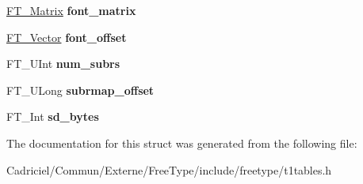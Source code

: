 \begin{DoxyCompactItemize}
\item 
\hypertarget{struct_c_i_d___face_dict_rec___aa418f6ce40b7574b6234e0ab48377e4b}{\hyperlink{struct_f_t___matrix__}{F\-T\-\_\-\-Matrix} {\bfseries font\-\_\-matrix}}\label{struct_c_i_d___face_dict_rec___aa418f6ce40b7574b6234e0ab48377e4b}

\item 
\hypertarget{struct_c_i_d___face_dict_rec___aa62daa8d45ed4a817f1207cbd452d61e}{\hyperlink{struct_f_t___vector__}{F\-T\-\_\-\-Vector} {\bfseries font\-\_\-offset}}\label{struct_c_i_d___face_dict_rec___aa62daa8d45ed4a817f1207cbd452d61e}

\item 
\hypertarget{struct_c_i_d___face_dict_rec___a611c406c8d7cd2e37d077070f4bb3ebe}{F\-T\-\_\-\-U\-Int {\bfseries num\-\_\-subrs}}\label{struct_c_i_d___face_dict_rec___a611c406c8d7cd2e37d077070f4bb3ebe}

\item 
\hypertarget{struct_c_i_d___face_dict_rec___a45d58111727af70018289e7c5b64ba8c}{F\-T\-\_\-\-U\-Long {\bfseries subrmap\-\_\-offset}}\label{struct_c_i_d___face_dict_rec___a45d58111727af70018289e7c5b64ba8c}

\item 
\hypertarget{struct_c_i_d___face_dict_rec___aecdf98f9671f22c1715ec929b77767ce}{F\-T\-\_\-\-Int {\bfseries sd\-\_\-bytes}}\label{struct_c_i_d___face_dict_rec___aecdf98f9671f22c1715ec929b77767ce}

\end{DoxyCompactItemize}


The documentation for this struct was generated from the following file\-:\begin{DoxyCompactItemize}
\item 
Cadriciel/\-Commun/\-Externe/\-Free\-Type/include/freetype/t1tables.\-h\end{DoxyCompactItemize}
